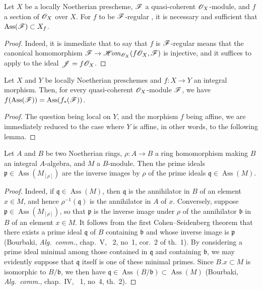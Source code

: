 \begin{corollary}[3.1.9]
\label{IV.3.1.9}
Let $X$ be a locally Noetherian prescheme, $\mathscr{F}$ a quasi-coherent $\mathscr{O}_X$-module, and $f$ a section of $\mathscr{O}_X$ over $X$.
For $f$ to be $\mathscr{F}$-regular , it is necessary and sufficient that $\operatorname{Ass}(\mathscr{F})\subset X_f$.
\end{corollary}

\begin{proof}
Indeed, it is immediate that to say that $f$ is $\mathscr{F}$-regular means that the canonical homomorphism $\mathscr{F}\to\mathscr{H}\!\mathit{om}_{\mathscr{O}_X}(f\mathscr{O}_X,\mathscr{F})$ is injective, and it suffices to apply  to the ideal $\mathscr{J}=f\mathscr{O}_X$.
\end{proof}

\begin{proposition}[3.1.10]
\label{IV.3.1.10}
Let $X$ and $Y$ be locally Noetherian preschemes and $f:X\to Y$ an integral morphism.
Then, for every quasi-coherent $\mathscr{O}_X$-module $\mathscr{F}$, we have $f(\operatorname{Ass}(\mathscr{F}))=\operatorname{Ass}(f_*(\mathscr{F}))$.
\end{proposition}

\begin{proof}
The question being local on $Y$, and the morphism $f$ being affine, we are immediately reduced to the case where $Y$ is affine, in other words, to the following lemma.
\end{proof}


\begin{lemma}[3.1.10.1]
\label{IV.3.1.10.1}
Let $A$ and $B$ be two Noetherian rings, $\rho:A\to B$ a ring homomorphism making $B$ an integral $A$-algebra, and $M$ a $B$-module.
Then the prime ideals $\mathfrak{p}\in\operatorname{Ass}(M_{[\rho]})$ are the inverse images by $\rho$ of the prime ideals $\mathfrak{q}\in\operatorname{Ass}(M)$.
\end{lemma}

\begin{proof}
Indeed, if $\mathfrak{q}\in\operatorname{Ass}(M)$, then $\mathfrak{q}$ is the annihilator in $B$ of an element $x\in M$, and hence $\rho^{-1}(\mathfrak{q})$ is the annihilator in $A$ of $x$. Conversely, suppose $\mathfrak{p}\in\operatorname{Ass}(M_{[\rho]})$, so that $\mathfrak{p}$ is the inverse image under $\rho$ of the annihilator $\mathfrak{b}$ in $B$ of an element $x\in M$. It follows from the first Cohen--Seidenberg theorem that there exists a prime ideal $\mathfrak{q}$ of $B$ containing $\mathfrak{b}$ and whose inverse image is $\mathfrak{p}$ (Bourbaki, \emph{Alg.\ comm.}, chap.~V, \textsection~2, no~1, cor.~2 of th.~1). By considering a prime ideal minimal among those contained in $\mathfrak{q}$ and containing $\mathfrak{b}$, we may evidently suppose that $\mathfrak{q}$ itself is one of these minimal primes. Since $B.x\subset M$ is isomorphic to $B/\mathfrak{b}$, we then have $\mathfrak{q}\in\operatorname{Ass}(B/\mathfrak{b})\subset\operatorname{Ass}(M)$ (Bourbaki, \emph{Alg.\ comm.}, chap.~IV, \textsection~1, no~4, th.~2).
\end{proof}

